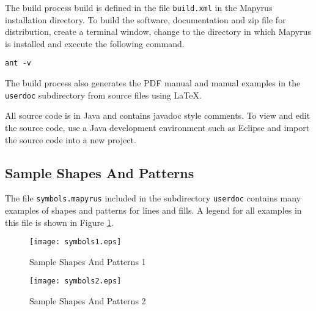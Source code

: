 The build process build is defined in the file \texttt{build.xml} in the
Mapyrus installation directory.  To build the software, documentation and zip
file for distribution, create a terminal window, change to the directory in
which Mapyrus is installed and execute the following command.

\begin{verbatim}
ant -v
\end{verbatim}

The build process also generates the PDF manual and manual examples in the
\texttt{userdoc} subdirectory from source files using \LaTeX.

All source code is in Java and contains javadoc style comments.  To view and
edit the source code, use a Java development environment such as Eclipse and
import the source code into a new project.


\subsection{Sample Shapes And Patterns}
The file \texttt{symbols.mapyrus} included in the subdirectory
\texttt{userdoc} contains many examples of shapes and patterns
for lines and fills.  A legend for all examples in this file is shown
in Figure \ref{samplesymbols}.

\begin{figure}[htb]
\label{samplesymbols}
\texttt{[image: symbols1.eps]}
\caption{Sample Shapes And Patterns 1}
\end{figure}

\begin{figure}[htb]
\texttt{[image: symbols2.eps]}
\caption{Sample Shapes And Patterns 2}
\end{figure}

